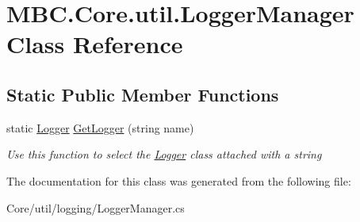 \hypertarget{class_m_b_c_1_1_core_1_1util_1_1_logger_manager}{\section{M\-B\-C.\-Core.\-util.\-Logger\-Manager Class Reference}
\label{class_m_b_c_1_1_core_1_1util_1_1_logger_manager}
}
\subsection*{Static Public Member Functions}
\begin{DoxyCompactItemize}
\item 
\hypertarget{class_m_b_c_1_1_core_1_1util_1_1_logger_manager_a8ec18cb07826e003bf2eb94ca672840f}{static \hyperlink{class_m_b_c_1_1_core_1_1util_1_1_logger}{Logger} \hyperlink{class_m_b_c_1_1_core_1_1util_1_1_logger_manager_a8ec18cb07826e003bf2eb94ca672840f}{Get\-Logger} (string name)}\label{class_m_b_c_1_1_core_1_1util_1_1_logger_manager_a8ec18cb07826e003bf2eb94ca672840f}

\begin{DoxyCompactList}\small\item\em Use this function to select the \hyperlink{class_m_b_c_1_1_core_1_1util_1_1_logger}{Logger} class attached with a string\end{DoxyCompactList}\end{DoxyCompactItemize}


The documentation for this class was generated from the following file\-:\begin{DoxyCompactItemize}
\item 
Core/util/logging/Logger\-Manager.\-cs\end{DoxyCompactItemize}

